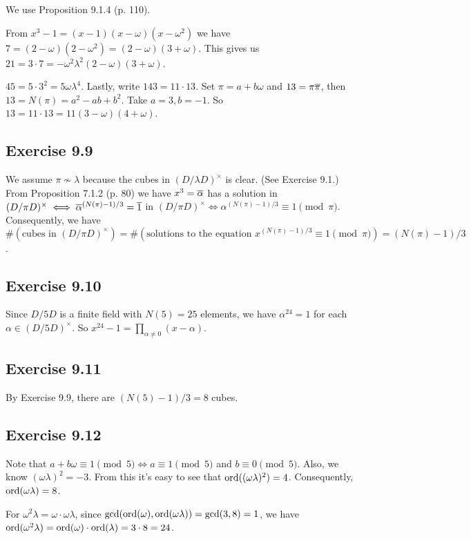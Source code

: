 \documentclass[../I&R.tex]{subfiles}
\begin{document}
We use Proposition 9.1.4 (p. 110).

From $x^3-1=(x-1)(x-\omega)(x-\omega^2)$ we have $7=(2-\omega)(2-\omega^2)=(2-\omega)(3+\omega)$. This gives us $21=3\cdot7=-\omega^2\lambda^2(2-\omega)(3+\omega)$.

$45=5\cdot3^2=5\omega\lambda^4$. Lastly, write $143=11\cdot13$. Set $\pi=a+b\omega$ and $13=\pi\overline{\pi}$, then $13=N(\pi)=a^2-ab+b^2$. Take $a=3,b=-1$. So $13=11\cdot13=11(3-\omega)(4+\omega)$.

\subsection*{Exercise 9.9}

We assume $\pi\not\sim\lambda$ because the cubes in $(D/\lambda D)^\times$ is clear. (See Exercise 9.1.) From Proposition 7.1.2 (p. 80) we have $x^3=\overline{\alpha}$ has a solution in $(D/\pi D)^\times \iff \overline{\alpha}^{(N(\pi)-1)/3}=\overline{1}$ in $(D/\pi D)^\times \iff \alpha^{(N(\pi)-1)/3}\equiv1\pmod{\pi}$. Consequently, we have $\#(\text{cubes in }(D/\pi D)^\times)=\#(\text{solutions to the equation } x^{(N(\pi)-1)/3}\equiv1\pmod{\pi})=(N(\pi)-1)/3$.

\subsection*{Exercise 9.10}

Since $D/5D$ is a finite field with $N(5)=25$ elements, we have $\alpha^{24}=1$ for each $\alpha\in(D/5D)^\times$. So $x^{24}-1=\prod_{\alpha\neq0} (x-\alpha)$.

\subsection*{Exercise 9.11}

By Exercise 9.9, there are $(N(5)-1)/3=8$ cubes.

\subsection*{Exercise 9.12}

Note that $a+b\omega\equiv1\pmod{5} \iff a\equiv1\pmod{5}$ and $b\equiv0\pmod{5}$. Also, we know $(\omega\lambda)^2=-3$. From this it's easy to see that $\operatorname{ord}((\omega\lambda)^2)=4$. Consequently, $\operatorname{ord}(\omega\lambda)=8$.

For $\omega^2\lambda=\omega\cdot\omega\lambda$, since $\gcd(\operatorname{ord}(\omega),\operatorname{ord}(\omega\lambda))=\gcd(3,8)=1$, we have $\operatorname{ord}(\omega^2\lambda)=\operatorname{ord}(\omega)\cdot\operatorname{ord}(\lambda)=3\cdot8=24$.
\end{document}
